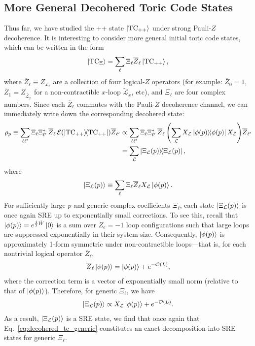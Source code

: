\subsection{More General Decohered Toric Code States}
Thus far, we have studied the ++ state $\ket{\text{TC}_{++}}$ under strong Pauli-$Z$ decoherence. It is interesting to consider more general initial toric code states, which can be written in the form
\begin{equation}
    \ket{\text{TC}_{\Xi}} = \sum_{\ell} \Xi_{\ell} \overline{Z}_{\ell} \ket{\text{TC}_{++}}, 
\end{equation}
where $\overline{Z}_{\ell} \equiv Z_{\mathcal{L}_{\ell}}$ are a collection of four logical-$Z$ operators (for example: $\overline{Z}_0 = 1$, $\overline{Z}_1 = Z_{\tilde{\mathcal{L}_x}}$ for a non-contractible $x$-loop $\tilde{\mathcal{L}}_x$, etc), and $\Xi_{\ell}$ are four complex numbers. Since each $\overline{Z}_{\ell}$ commutes with the Pauli-$Z$ decoherence channel, we can immediately write down the corresponding decohered state:
\begin{equation}
\label{eq:decohered_tc_generic}
    \begin{split}
        \rho_p \equiv \sum_{\ell \ell'} \Xi_{\ell} \Xi_{\ell'}^* \, \overline{Z}_{\ell} \, \mathcal{E}(\dyad{\TC_{++}}) \overline{Z}_{\ell'} &\propto \sum_{\ell \ell'} \Xi_{\ell} \Xi_{\ell'}^* \, \overline{Z}_{\ell} \, \qty( \sum_{\mathcal{L}} X_{\mathcal{L}} \dyad{\phi(p)} X_{\mathcal{L}} ) \overline{Z}_{\ell'} \\
        &= \sum_{\mathcal{L}} \dyad{\Xi_{\mathcal{L}}(p)} ,
    \end{split}
\end{equation}
where
\begin{equation}
    \ket{\Xi_{\mathcal{L}}(p)} \equiv \sum_{\ell} \Xi_{\ell} \overline{Z}_{\ell} X_{\mathcal{L}} \ket{\phi(p)} .
\end{equation}
For sufficiently large $p$ and generic complex coefficients $\Xi_{\ell}$, each state $\ket{\Xi_{\mathcal{L}}(p)}$ is once again SRE up to exponentially small corrections. To see this, recall that $\ket{\phi(p)} = e^{\frac{1}{2} \hat{W}} \ket{0}$ is a sum over $Z_e = -1$ loop configurations such that large loops are suppressed exponentially in their system size. Consequently, $\ket{\phi(p)}$ is approximately 1-form symmetric under non-contractible loops---that is, for each nontrivial logical operator $\overline{Z}_{\ell}$,
\begin{equation}
    \overline{Z}_{\ell} \ket{\phi(p)} = \ket{\phi(p)} + e^{-\mathcal{O}(L)} ,
\end{equation}
where the correction term is a vector of exponentially small norm (relative to that of $\ket{\phi(p)}$). Therefore, for generic $\Xi_{\ell}$, we have
\begin{equation}
    \ket{\Xi_{\mathcal{L}}(p)} \propto X_{\mathcal{L}} \ket{\phi(p)} + e^{-\mathcal{O}(L)} .
\end{equation}
As a result, $\ket{\Xi_{\mathcal{L}}(p)}$ is a SRE state, we find that once again that Eq.~\eqref{eq:decohered_tc_generic} constitutes an exact decomposition into SRE states for generic $\Xi_{\ell}$.


